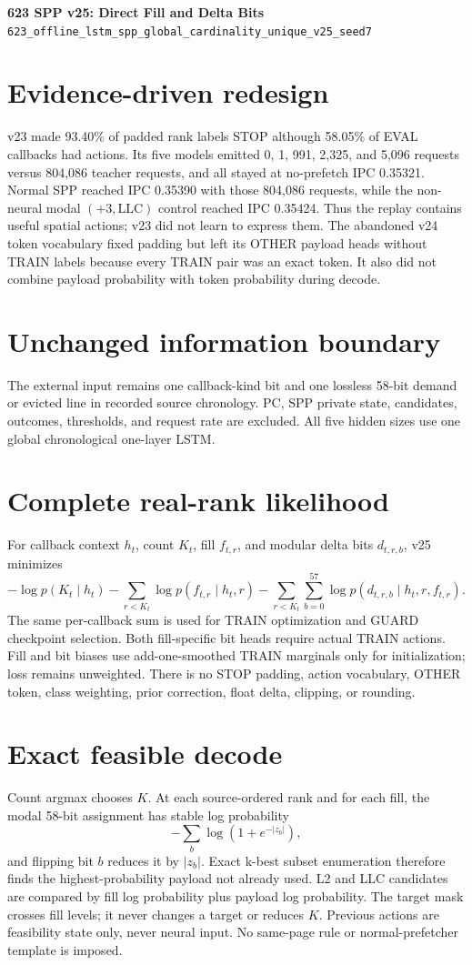 \documentclass[10pt]{article}
\begin{document}
{\LARGE\bfseries\color{navy} 623 SPP v25: Direct Fill and Delta Bits}\\[3pt]
\texttt{623\_offline\_lstm\_spp\_global\_cardinality\_unique\_v25\_seed7}

\section*{Evidence-driven redesign}
v23 made 93.40\% of padded rank labels STOP although 58.05\% of EVAL callbacks
had actions.  Its five models emitted 0, 1, 991, 2,325, and 5,096 requests
versus 804,086 teacher requests, and all stayed at no-prefetch IPC 0.35321.
Normal SPP reached IPC 0.35390 with those 804,086 requests, while the non-neural
modal $(+3,\mathrm{LLC})$ control reached IPC 0.35424.  Thus the replay contains
useful spatial actions; v23 did not learn to express them.
The abandoned v24 token vocabulary fixed padding but left its OTHER payload
heads without TRAIN labels because every TRAIN pair was an exact token.  It also
did not combine payload probability with token probability during decode.

\section*{Unchanged information boundary}
The external input remains one callback-kind bit and one lossless 58-bit demand
or evicted line in recorded source chronology.  PC, SPP private state,
candidates, outcomes, thresholds, and request rate are excluded.  All five
hidden sizes use one global chronological one-layer LSTM.

\section*{Complete real-rank likelihood}
For callback context $h_t$, count $K_t$, fill $f_{t,r}$, and modular delta bits
$d_{t,r,b}$, v25 minimizes
\[
 -\log p(K_t\mid h_t)
 -\sum_{r<K_t}\log p(f_{t,r}\mid h_t,r)
 -\sum_{r<K_t}\sum_{b=0}^{57}
   \log p(d_{t,r,b}\mid h_t,r,f_{t,r}).
\]
The same per-callback sum is used for TRAIN optimization and GUARD checkpoint
selection.  Both fill-specific bit heads require actual TRAIN actions.  Fill
and bit biases use add-one-smoothed TRAIN marginals only for initialization;
loss remains unweighted.  There is no STOP padding, action vocabulary, OTHER
token, class weighting, prior correction, float delta, clipping, or rounding.

\section*{Exact feasible decode}
Count argmax chooses $K$.  At each source-ordered rank and for each fill, the
modal 58-bit assignment has stable log probability
\[
 -\sum_b\log(1+e^{-|z_b|}),
\]
and flipping bit $b$ reduces it by $|z_b|$.  Exact k-best subset enumeration
therefore finds the highest-probability payload not already used.  L2 and LLC
candidates are compared by fill log probability plus payload log probability.
The target mask crosses fill levels; it never changes a target or reduces $K$.
Previous actions are feasibility state only, never neural input.  No same-page
rule or normal-prefetcher template is imposed.
\end{document}
